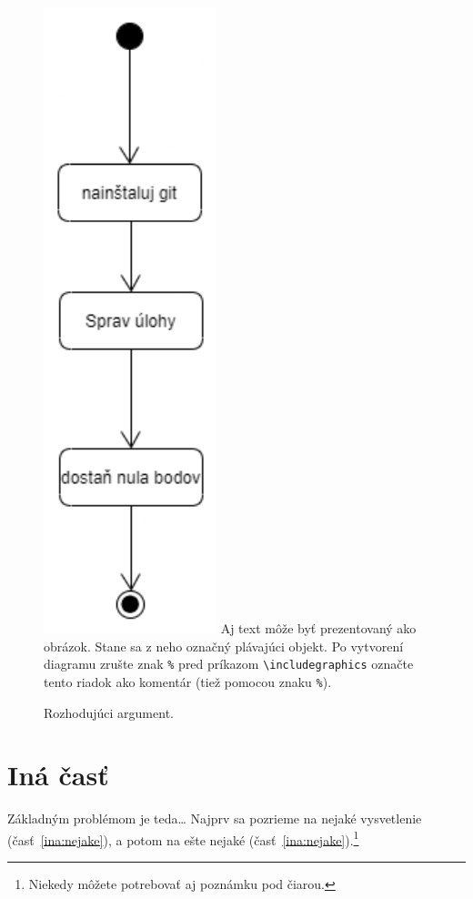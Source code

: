 \documentclass[10pt,twoside,slovak,a4paperr]{coursepaper}
\begin{document}
\begin{figure}[h]
\centering
\includegraphics[scale=0.5]{first.pdf}
Aj text môže byť prezentovaný ako obrázok. Stane sa z neho označný plávajúci objekt. Po vytvorení diagramu zrušte znak \texttt{\%} pred príkazom \verb|\includegraphics| označte tento riadok ako komentár (tiež pomocou znaku \texttt{\%}).
\caption{Rozhodujúci argument.}
\label{f:rozhod}
\end{figure}



\section{Iná časť} \label{ina}

Základným problémom je teda\ldots{} Najprv sa pozrieme na nejaké vysvetlenie (časť~\ref{ina:nejake}), a potom na ešte nejaké (časť~\ref{ina:nejake}).\footnote{Niekedy môžete potrebovať aj poznámku pod čiarou.}
\end{document}

